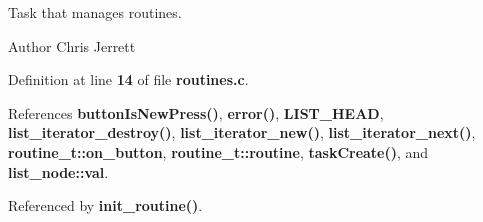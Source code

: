 Task that manages routines. 

\begin{DoxyAuthor}{Author}
Chris Jerrett 
\end{DoxyAuthor}


Definition at line \textbf{ 14} of file \textbf{ routines.\+c}.



References \textbf{ button\+Is\+New\+Press()}, \textbf{ error()}, \textbf{ L\+I\+S\+T\+\_\+\+H\+E\+AD}, \textbf{ list\+\_\+iterator\+\_\+destroy()}, \textbf{ list\+\_\+iterator\+\_\+new()}, \textbf{ list\+\_\+iterator\+\_\+next()}, \textbf{ routine\+\_\+t\+::on\+\_\+button}, \textbf{ routine\+\_\+t\+::routine}, \textbf{ task\+Create()}, and \textbf{ list\+\_\+node\+::val}.



Referenced by \textbf{ init\+\_\+routine()}.



